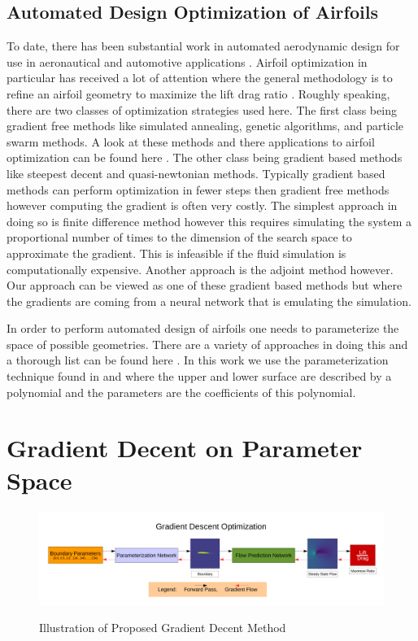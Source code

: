 \documentclass{article} %
\begin{document}
\subsection{Automated Design Optimization of Airfoils}

To date, there has been substantial work in automated aerodynamic design for use in aeronautical and automotive applications \cite{ando2010automotive} \cite{demultiplexer}. Airfoil optimization in particular has received a lot of attention where the general methodology is to refine an airfoil geometry to maximize the lift drag ratio \cite{drela1998pros}. Roughly speaking, there are two classes of optimization strategies used here. The first class being gradient free methods like simulated annealing, genetic algorithms, and particle swarm methods. A look at these methods and there applications to airfoil optimization can be found here \cite{mukesh2012application}. The other class being gradient based methods like steepest decent and quasi-newtonian methods. Typically gradient based methods can perform optimization in fewer steps then gradient free methods however computing the gradient is often very costly. The simplest approach in doing so is finite difference method however this requires simulating the system a proportional number of times to the dimension of the search space to approximate the gradient. This is infeasible if the fluid simulation is computationally expensive. Another approach is the adjoint method however. Our approach can be viewed as one of these gradient based methods but where the gradients are coming from a neural network that is emulating the simulation.

In order to perform automated design of airfoils one needs to parameterize the space of possible geometries. There are a variety of approaches in doing this and a thorough list can be found here \cite{salunke2014airfoil}. In this work we use the parameterization technique found in \cite{lane2009surface} and \cite{hilton2007universal} where the upper and lower surface are described by a polynomial and the parameters are the coefficients of this polynomial.

\section{Gradient Decent on Parameter Space}

\begin{figure}[h]
\begin{center}
\includegraphics[scale=0.34]{./gradient_descent_optimization.pdf}
\label{gradient_descent_optimization}
\end{center}
\caption{Illustration of Proposed Gradient Decent Method}
\end{figure}
\end{document}
